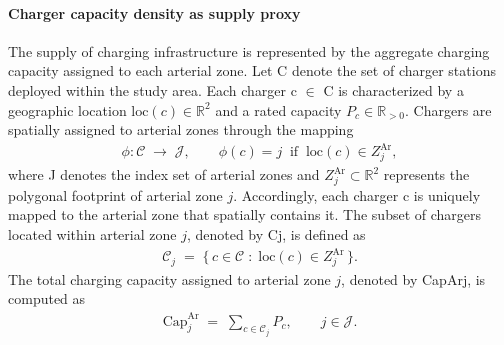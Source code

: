 \paragraph{Charger capacity density as supply proxy}
The supply of charging infrastructure is represented by the aggregate charging capacity assigned to each arterial zone. Let \gls{C} denote the set of charger stations deployed within the study area. Each charger \gls{c} $ \in $ \gls{C} is characterized by a geographic location $\mathrm{loc}(c) \in \mathbb{R}^2$ and a rated capacity $P_c \in \mathbb{R}_{>0}$. Chargers are spatially assigned to arterial zones through the mapping
\begin{align}
  \label{eq:charger_mapping}
  \phi : \mathcal{C} \;\longrightarrow\; \mathcal{J}, 
  \qquad \phi(c) = j \;\;\text{if}\;\; \mathrm{loc}(c) \in Z^{\mathrm{Ar}}_j,
\end{align}
where \gls{J} denotes the index set of arterial zones and 
$Z^{\mathrm{Ar}}_j \subset \mathbb{R}^2$ represents the polygonal footprint of arterial zone $j$. 
Accordingly, each charger \gls{c} is uniquely mapped to the arterial zone that spatially contains it.
The subset of chargers located within arterial zone $j$, denoted by \gls{Cj}, is defined as
\begin{align}
  \label{eq:chargers_in_zone}
  \mathcal{C}_j \;=\; \{\, c \in \mathcal{C} \;:\; \mathrm{loc}(c) \in Z^{\mathrm{Ar}}_j \,\}.
\end{align}
The total charging capacity assigned to arterial zone $j$, denoted by \gls{CapArj}, is computed as
\begin{align}
  \label{eq:Cap_zone_by_subset}
  \mathrm{Cap}^{\mathrm{Ar}}_{j}
  \;=\;
  \sum_{c \in \mathcal{C}_j} P_c,
  \qquad j \in \mathcal{J}.
\end{align}
